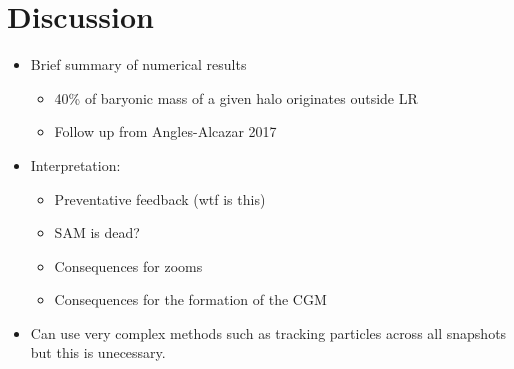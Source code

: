 \section{Discussion}

\begin{itemize}
	\item Brief summary of numerical results
	\begin{itemize}
		\item 40\% of baryonic mass of a given halo originates outside LR
		\item Follow up from Angles-Alcazar 2017
	\end{itemize}
	\item Interpretation:
	\begin{itemize}
		\item Preventative feedback (wtf is this)
		\item SAM is dead?
		\item Consequences for zooms
		\item Consequences for the formation of the CGM
	\end{itemize}
	\item Can use very complex methods such as tracking particles across all
	      snapshots but this is unecessary.
\end{itemize}